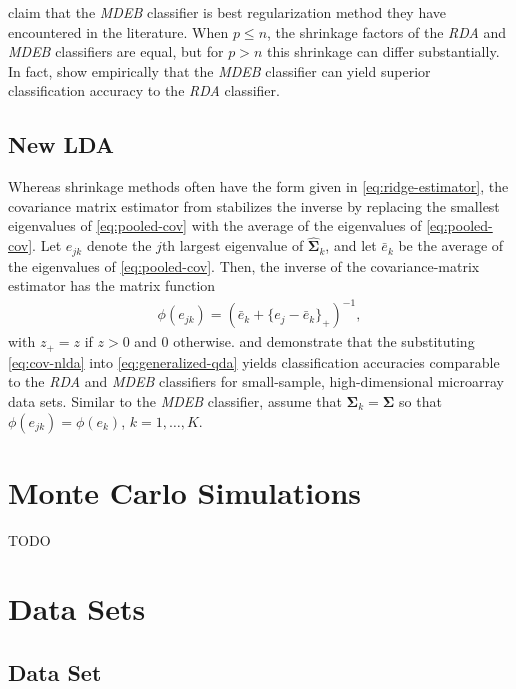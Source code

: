 \documentclass[11pt]{article}
\begin{document}
\cite{Srivastava:2007ww} claim that the \emph{MDEB} classifier is best regularization method they have encountered in the literature. When $p \le n$, the shrinkage factors of the \emph{RDA} and \emph{MDEB} classifiers are equal, but for $p > n$ this shrinkage can differ substantially. In fact, \cite{Ramey:2011ji} show empirically that the \emph{MDEB} classifier can yield superior classification accuracy to the \emph{RDA} classifier.


\subsection{New LDA}
Whereas shrinkage methods often have the form given in \eqref{eq:ridge-estimator}, the covariance matrix estimator from \cite{Thomaz:2006ef} stabilizes the inverse by replacing the smallest eigenvalues of \eqref{eq:pooled-cov} with the average of the eigenvalues of \eqref{eq:pooled-cov}. Let $e_{jk}$ denote the $j$th largest eigenvalue of $\widehat{\bm \Sigma}_k$, and let $\bar{e}_k$ be the average of the eigenvalues of \eqref{eq:pooled-cov}. Then, the inverse of the covariance-matrix estimator has the matrix function
\begin{align}
	\phi(e_{jk}) = (\bar{e}_k + \{e_j - \bar{e}_k\}_+)^{-1},\label{eq:cov-nlda}
\end{align}
with $z_+ = z$ if $z > 0$ and 0 otherwise. \cite*{Xu:2009fl} and \cite{Ramey:2011ji} demonstrate that the substituting \eqref{eq:cov-nlda} into \eqref{eq:generalized-qda} yields classification accuracies comparable to the \emph{RDA} and \emph{MDEB} classifiers for small-sample, high-dimensional microarray data sets. Similar to the \emph{MDEB} classifier, \cite{Thomaz:2006ef} assume that $\bm \Sigma_k = \bm \Sigma$ so that $\phi(e_{jk}) = \phi(e_k)$, $k = 1, \ldots, K$.  


\section{Monte Carlo Simulations}

TODO

\section{Data Sets}

\subsection{\cite{Burczynski:2006ik} Data Set}
\end{document}
